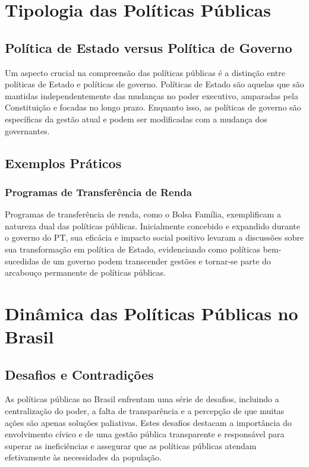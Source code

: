 \documentclass[
   article,       
   12pt,          
   oneside,       
   a4paper,       
   english,       
   brazil,        
   sumario=tradicional
   ]{abntex2}
\begin{document}
\section{Tipologia das Políticas Públicas}
    \subsection{Política de Estado versus Política de Governo}
        Um aspecto crucial na compreensão das políticas públicas é a distinção entre políticas de Estado e políticas de governo. Políticas de Estado são aquelas que são mantidas independentemente das mudanças no poder executivo, amparadas pela Constituição e focadas no longo prazo. Enquanto isso, as políticas de governo são específicas da gestão atual e podem ser modificadas com a mudança dos governantes.
        
    \subsection{Exemplos Práticos}
        \subsubsection{Programas de Transferência de Renda}
            Programas de transferência de renda, como o Bolsa Família, exemplificam a natureza dual das políticas públicas. Inicialmente concebido e expandido durante o governo do PT, sua eficácia e impacto social positivo levaram a discussões sobre sua transformação em política de Estado, evidenciando como políticas bem-sucedidas de um governo podem transcender gestões e tornar-se parte do arcabouço permanente de políticas públicas.
            
\section{Dinâmica das Políticas Públicas no Brasil}
    \subsection{Desafios e Contradições}
        As políticas públicas no Brasil enfrentam uma série de desafios, incluindo a centralização do poder, a falta de transparência e a percepção de que muitas ações são apenas soluções paliativas. Estes desafios destacam a importância do envolvimento cívico e de uma gestão pública transparente e responsável para superar as ineficiências e assegurar que as políticas públicas atendam efetivamente às necessidades da população.
        
\end{document}

